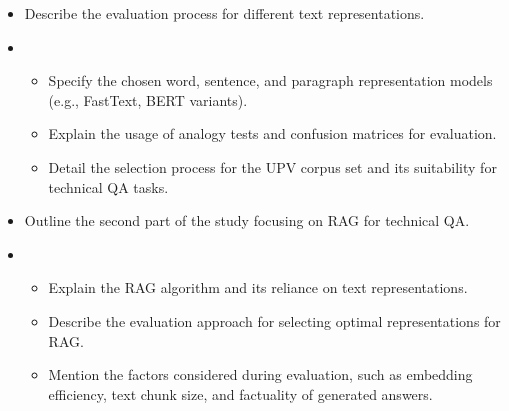 \begin{itemize}
    \item Describe the evaluation process for different text representations.
    \item \begin{itemize}
        \item{Specify the chosen word, sentence, and paragraph representation models (e.g., FastText, BERT variants).}
        \item{Explain the usage of analogy tests and confusion matrices for evaluation.}
        \item{Detail the selection process for the UPV corpus set and its suitability for technical QA tasks.}
      \end{itemize}
    \item Outline the second part of the study focusing on RAG for technical QA.
    \item \begin{itemize}
        \item{Explain the RAG algorithm and its reliance on text representations.}
        \item{Describe the evaluation approach for selecting optimal representations for RAG.}
        \item{Mention the factors considered during evaluation, such as embedding efficiency, text chunk size, and factuality of generated answers.}
      \end{itemize}
\end{itemize}










